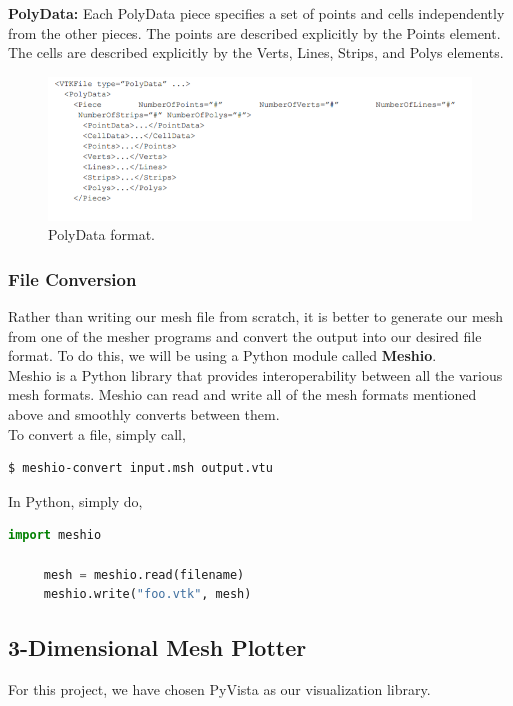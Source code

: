 \documentclass[onecolumn, draftclsnofoot,10pt, compsoc]{IEEEtran}
\begin{document}
\noindent
\textbf{PolyData:} Each PolyData piece specifies a set of points and cells independently from the other pieces. The points are described explicitly by the Points element. The cells are described explicitly by the Verts, Lines, Strips, and Polys elements.

\begin{figure}[H]
\centering
\includegraphics[scale=0.8]{PolyData.png}
\caption{PolyData format.}
\label{fig:polydata}
\end{figure}

\subsubsection{File Conversion}
Rather than writing our mesh file from scratch, it is better to generate our mesh from one of the mesher programs and convert the output into our desired file format. To do this, we will be using a Python module called \textbf{Meshio}.\\

\noindent
Meshio is a Python library that provides interoperability between all the various mesh formats. Meshio can read and write all of the mesh formats mentioned above and smoothly converts between them.\\

\noindent
To convert a file, simply call,
\begin{lstlisting}[language=bash]
     $ meshio-convert input.msh output.vtu
\end{lstlisting}

\noindent
In Python, simply do,
\begin{lstlisting}[language=python]
     import meshio

     mesh = meshio.read(filename)
     meshio.write("foo.vtk", mesh)
\end{lstlisting}


\subsection{3-Dimensional Mesh Plotter}
For this project, we have chosen PyVista as our visualization library.
\end{document}
